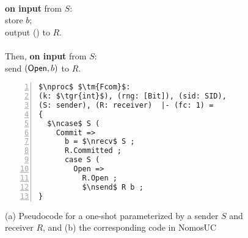 \begin{figure}
\begin{minipage}{0.38\textwidth}
\begin{bbox}[title={Functionality $\F_{\m{com}}(S, R)$}]\\
\textbf{on input}  from $S$:\\
\hspace*{1em} store $b$;\\
\hspace*{1em} output () to $R$.\\ \\
Then, \textbf{on input}  from $S$:\\
\hspace*{1em} send $(\mathsf{Open}, b)$ to $R$.
\end{bbox}
\end{minipage}
\hspace{3em}
\begin{minipage}{0.5\textwidth}
\begin{lstlisting}[basicstyle=\footnotesize\BeraMonottFamily, frame=single, mathescape, numbers=left]
$\nproc$ $\tm{Fcom}$: 
(k: $\tgr{int}$), (rng: [Bit]), (sid: SID),
(S: sender), (R: receiver)  |- (fc: 1) =
{
  $\ncase$ S (
    Commit => 
      b = $\nrecv$ S ;
      R.Committed ;
      case S (
        Open => 
          R.Open ;
          $\nsend$ R b ;
}
\end{lstlisting}
\end{minipage}
\caption{(a) Pseudocode for a one-shot \Fcom parameterized by a sender $S$ and receiver $R$,
and (b) the corresponding code in NomosUC}
\label{fig:fcomideal}
\vspace{-4mm}
\end{figure}
